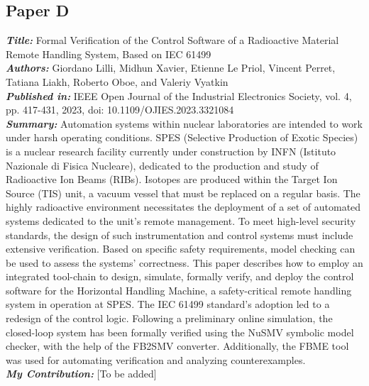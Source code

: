 \subsection{Paper D}
\textbf{\textit{Title:}} Formal Verification of the Control Software of a Radioactive Material Remote Handling System, Based on IEC 61499\\
\textbf{\textit{Authors:}} Giordano Lilli, Midhun Xavier, Etienne Le Priol, Vincent Perret, Tatiana Liakh, Roberto Oboe, and Valeriy Vyatkin\\
\textbf{\textit{Published in:}} IEEE Open Journal of the Industrial Electronics Society, vol. 4, pp. 417-431, 2023, doi: 10.1109/OJIES.2023.3321084\\
\textbf{\textit{Summary:}} Automation systems within nuclear laboratories are intended to work under harsh operating conditions. SPES (Selective Production of Exotic Species) is a nuclear research facility currently under construction by INFN (Istituto Nazionale di Fisica Nucleare), dedicated to the production and study of Radioactive Ion Beams (RIBs). Isotopes are produced within the Target Ion Source (TIS) unit, a vacuum vessel that must be replaced on a regular basis. The highly radioactive environment necessitates the deployment of a set of automated systems dedicated to the unit's remote management. To meet high-level security standards, the design of such instrumentation and control systems must include extensive verification. Based on specific safety requirements, model checking can be used to assess the systems' correctness. This paper describes how to employ an integrated tool-chain to design, simulate, formally verify, and deploy the control software for the Horizontal Handling Machine, a safety-critical remote handling system in operation at SPES. The IEC 61499 standard's adoption led to a redesign of the control logic. Following a preliminary online simulation, the closed-loop system has been formally verified using the NuSMV symbolic model checker, with the help of the FB2SMV converter. Additionally, the FBME tool was used for automating verification and analyzing counterexamples.\\
\textbf{\textit{My Contribution:}} [To be added]

